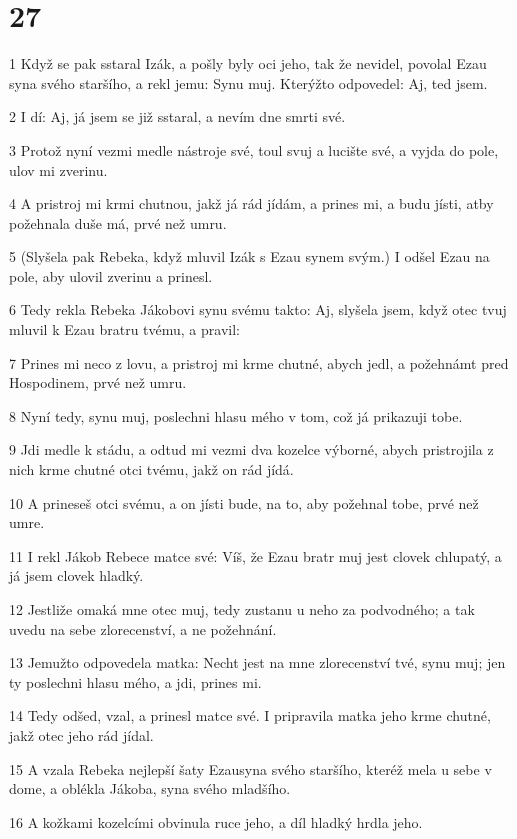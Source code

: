 \chapter{27}

\par 1 Když se pak sstaral Izák, a pošly byly oci jeho, tak že nevidel, povolal Ezau syna svého staršího, a rekl jemu: Synu muj. Kterýžto odpovedel: Aj, ted jsem.
\par 2 I dí: Aj, já jsem se již sstaral, a nevím dne smrti své.
\par 3 Protož nyní vezmi medle nástroje své, toul svuj a lucište své, a vyjda do pole, ulov mi zverinu.
\par 4 A pristroj mi krmi chutnou, jakž já rád jídám, a prines mi, a budu jísti, atby požehnala duše má, prvé než umru.
\par 5 (Slyšela pak Rebeka, když mluvil Izák s Ezau synem svým.) I odšel Ezau na pole, aby ulovil zverinu a prinesl.
\par 6 Tedy rekla Rebeka Jákobovi synu svému takto: Aj, slyšela jsem, když otec tvuj mluvil k Ezau bratru tvému, a pravil:
\par 7 Prines mi neco z lovu, a pristroj mi krme chutné, abych jedl, a požehnámt pred Hospodinem, prvé než umru.
\par 8 Nyní tedy, synu muj, poslechni hlasu mého v tom, což já prikazuji tobe.
\par 9 Jdi medle k stádu, a odtud mi vezmi dva kozelce výborné, abych pristrojila z nich krme chutné otci tvému, jakž on rád jídá.
\par 10 A prineseš otci svému, a on jísti bude, na to, aby požehnal tobe, prvé než umre.
\par 11 I rekl Jákob Rebece matce své: Víš, že Ezau bratr muj jest clovek chlupatý, a já jsem clovek hladký.
\par 12 Jestliže omaká mne otec muj, tedy zustanu u neho za podvodného; a tak uvedu na sebe zlorecenství, a ne požehnání.
\par 13 Jemužto odpovedela matka: Necht jest na mne zlorecenství tvé, synu muj; jen ty poslechni hlasu mého, a jdi, prines mi.
\par 14 Tedy odšed, vzal, a prinesl matce své. I pripravila matka jeho krme chutné, jakž otec jeho rád jídal.
\par 15 A vzala Rebeka nejlepší šaty Ezausyna svého staršího, kteréž mela u sebe v dome, a oblékla Jákoba, syna svého mladšího.
\par 16 A kožkami kozelcími obvinula ruce jeho, a díl hladký hrdla jeho.
